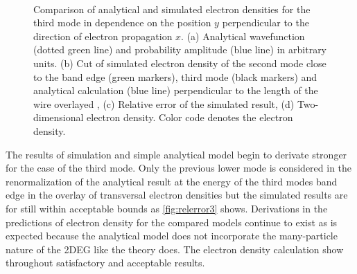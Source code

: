 \begin{figure}[h]
  \begin{center}
 \qquad
    \\
    \qquad
    \caption{Comparison of analytical and simulated electron densities for the third mode in dependence on the position $y$ perpendicular to the direction of electron propagation $x$. (a) Analytical wavefunction (dotted green line) and probability amplitude (blue line) in arbitrary units. (b) Cut of simulated electron density of the second mode close to the band edge (green markers), third mode (black markers) and analytical calculation (blue line) perpendicular to the length of the wire overlayed , (c) Relative error of the simulated result, (d) Two-dimensional electron density. Color code denotes the electron density.}\label{fig:mode3}
  \end{center}
\end{figure}
The results of simulation and simple analytical model begin to derivate stronger for the case of the third mode. Only the previous lower mode is considered in the renormalization of the analytical result at the energy of the third modes band edge in the overlay of transversal electron densities but the simulated results are for still within acceptable bounds as \cref{fig:relerror3} shows. Derivations in the predictions of electron density for the compared models continue to exist as is expected because the analytical model does not incorporate the many-particle nature of the 2DEG like the \gfnc{} theory does.
The electron density calculation show throughout satisfactory and acceptable results.\par
\FloatBarrier
